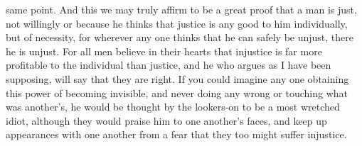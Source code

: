 same point. And this we may truly affirm to be a great proof that a
man is just, not willingly or because he thinks that justice is any
good to him individually, but of necessity, for wherever any one
thinks that he can safely be unjust, there he is unjust. For all men
believe in their hearts that injustice is far more profitable to the
individual than justice, and he who argues as I have been supposing,
will say that they are right. If you could imagine any one obtaining
this power of becoming invisible, and never doing any wrong or
touching what was another's, he would be thought by the lookers-on to
be a most wretched idiot, although they would praise him to one
another's faces, and keep up appearances with one another from a fear
that they too might suffer injustice.

